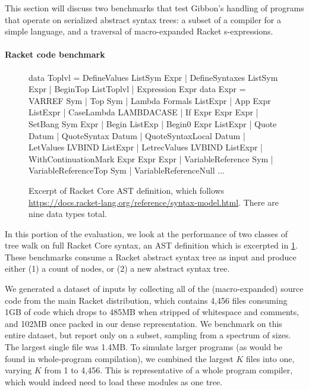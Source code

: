 This section will discuss two benchmarks that test Gibbon's handling of programs
that operate on serialized abstract syntax trees: a subset of a compiler for
a simple language, and a traversal of macro-expanded Racket s-expressions.

\paragraph{Racket code benchmark}

\begin{figure}[t]
      \footnotesize
  \begin{code}
data Toplvl = DefineValues ListSym Expr | DefineSyntaxes ListSym Expr
            | BeginTop ListToplvl       | Expression Expr
data Expr = VARREF Sym | Top Sym  | Lambda Formals ListExpr  | App Expr ListExpr
      | CaseLambda LAMBDACASE     | If Expr Expr Expr        | SetBang Sym Expr
      | Begin ListExp             | Begin0 Expr ListExpr     | Quote Datum
      | QuoteSyntax Datum         | QuoteSyntaxLocal Datum
      | LetValues LVBIND ListExpr | LetrecValues LVBIND ListExpr
      | WithContinuationMark Expr Expr Expr
      | VariableReference Sym | VariableReferenceTop Sym | VariableReferenceNull
$\ldots$
\end{code}
\normalsize
  \caption{Excerpt of Racket Core AST definition, which
   follows \url{https://docs.racket-lang.org/reference/syntax-model.html}.
   There are nine data types total.}\label{fig:racket-core}
\end{figure}

In this portion of the evaluation, we look at
the performance of two classes of tree walk
on full Racket Core syntax, an AST definition which is excerpted in \cref{fig:racket-core}.
%
These benchmarks consume a Racket abstract syntax tree as input and produce
either (1) a count of nodes, or (2) a new abstract syntax tree.

We generated a dataset of inputs by collecting all of the (macro-expanded) source
code from the main Racket distribution, which contains 4,456 files consuming
1GB of code which drops to 485MB when stripped of whitespace and comments, and
102MB once packed in our dense representation.
%
We benchmark on this entire dataset, but report only on a subset, sampling from
a spectrum of sizes.
%
The largest single file was 1.4MB.
To simulate larger programs (as would be found in whole-program compilation), we
combined the largest $K$ files into one, varying $K$ from 1 to 4,456.
%
This is representative of a whole program compiler, which would indeed need to
load these modules as one tree.

